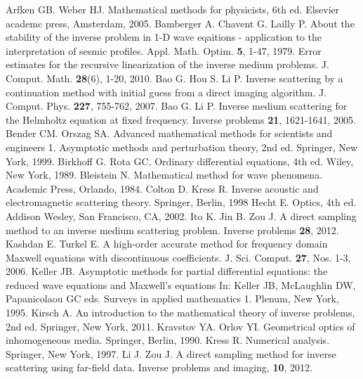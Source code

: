 \documentclass[12pt,twoside]{report}
\begin{document}
\newpage
\begin{thebibliography}{2d}
Arfken GB. Weber HJ. Mathematical methods for physicists, 6th ed. Elsevier academc press, Amsterdam, 2005.
Bamberger A. Chavent G. Lailly P. About the stability of the inverse problem in 1-D wave eqaitions - application to the interpretation of sesmic profiles. Appl. Math. Optim. \textbf{5}, 1-47, 1979.
Error estimates for the recursive linearization of the inverse medium problems. J. Comput. Math. \textbf{28}(6), 1-20, 2010.
Bao G. Hou S. Li P. Inverse scattering by a continuation method with initial guess from a direct imaging algorithm. J. Comput. Phys. \textbf{227}, 755-762, 2007.
Bao G. Li P. Inverse medium scattering for the Helmholtz equation at fixed frequency. Inverse problems \textbf{21}, 1621-1641, 2005.
Bender CM. Orszag SA. Advanced mathematical methods for scientists and engineers 1. Asymptotic methods and perturbation theory, 2nd ed. Springer, New York, 1999.
Birkhoff G. Rota GC. Ordinary differential equations, 4th ed. Wiley, New York, 1989.
Bleistein N. Mathematical method for wave phenomena. Academic Press, Orlando, 1984.
Colton D. Kress R. Inverse acoustic and electromagnetic scattering theory. Springer, Berlin, 1998 
Hecht E. Optics, 4th ed. Addison Wesley, San Francisco, CA, 2002.
Ito K. Jin B. Zou J. A direct sampling method to an inverse medium scattering problem. Inverse problems \textbf{28}, 2012.
Kashdan E. Turkel E. A high-order accurate method for frequency domain Maxwell equations with discontinuous coefficients. J. Sci. Comput. \textbf{27}, Nos. 1-3, 2006.  
Keller JB. Asymptotic methods for partial differential equations: the reduced wave equations and Maxwell's equations In: Keller JB, McLaughlin DW, Papanicolaou GC eds. Surveys in applied mathematics 1. Plenum, New York, 1995.
Kirsch A. An introduction to the mathematical theory of inverse problems, 2nd ed. Springer, New York, 2011.
Kravstov YA. Orlov YI. Geometrical optics of inhomogeneous media. Springer, Berlin, 1990.
Kress R. Numerical analysis. Springer, New York, 1997.
Li J. Zou J. A direct sampling method for inverse scattering using far-field data. Inverse problems and imaging, \textbf{10}, 2012.

\end{thebibliography}
\end{document}
